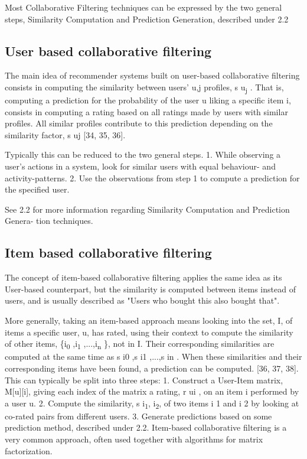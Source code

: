 Most Collaborative Filtering techniques can be expressed by the two general steps, Similarity Computation and Prediction Generation, described under 2.2

\subsection{User based collaborative filtering}
The main idea of recommender systems built on user-based collaborative filtering consists in computing the similarity between users’ {u,j} profiles, s u\textsubscript{j} . That is, computing a prediction for the probability of the user u liking a specific item i, consists in computing a rating based on all ratings made by users with similar profiles. All similar profiles contribute to this prediction depending on the similarity factor, s uj [34, 35, 36]. 

Typically this can be reduced to the two general steps. 
1. While observing a user’s actions in a system, look for similar users with equal behaviour- and activity-patterns. 
2. Use the observations from step 1 to compute a prediction for the specified user. 

See 2.2 for more information regarding Similarity Computation and Prediction Genera- tion techniques.

\subsection{Item based collaborative filtering}
The concept of item-based collaborative filtering applies the same idea as its User-based counterpart, but the similarity is computed between items instead of users, and is usually described as "Users who bought this also bought that". 

More generally, taking an item-based approach means looking into the set, I, of items a specific user, u, has rated, using their context to compute the similarity of other items, \{i\textsubscript{0} ,i\textsubscript{1} ,...,i\textsubscript{n} \}, not in I. Their corresponding similarities are computed at the same time as {s i0 ,s i1 ,...,s in }. When these similarities and their corresponding items have been found, a prediction can be computed. [36, 37, 38]. 
This can typically be split into three steps: 
1. Construct a User-Item matrix, M[u][i], giving each index of the matrix a rating, r ui , on an item i performed by a user u. 
2. Compute the similarity, s i\textsubscript{1}, i\textsubscript{2}, of two items i 1 and i 2 by looking at co-rated pairs from different users.
3. Generate predictions based on some prediction method, described under 2.2. Item-based collaborative filtering is a very common approach, often used together with algorithms for matrix factorization.

